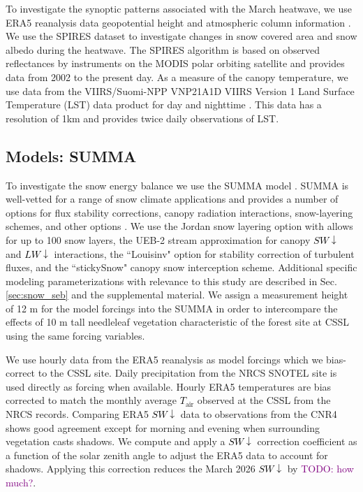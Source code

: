 \documentclass[12pt]{iopjournal}
\newcommand{\comment}[1]{\textcolor{purple}{TODO: #1}}      %
\newcommand{\tair}{\textcolor{black}{$T_{\mathrm{air}}$}\xspace}
\newcommand{\lwdn}{\textcolor{black}{$LW\downarrow$}\xspace}
\newcommand{\swdn}{\textcolor{black}{$SW\downarrow$}\xspace}
\begin{document}
To investigate the synoptic patterns associated with the March heatwave, we use ERA5 reanalysis data geopotential height and atmospheric column information \citep{Hersbach2020-era5}.
We use the SPIRES \citep{Bair2021-spires} dataset to investigate changes in snow covered area and snow albedo during the heatwave. 
The SPIRES algorithm is based on observed reflectances by instruments on the MODIS polar orbiting satellite and provides data from 2002 to the present day. 
As a measure of the canopy temperature, we use data from the VIIRS/Suomi-NPP VNP21A1D VIIRS Version 1 Land Surface Temperature (LST) data product for day and nighttime \citep{hulley2018viirs}.
This data has a resolution of 1km and provides twice daily observations of LST.


\subsection{Models: SUMMA}\label{sec:models:summa}
To investigate the snow energy balance we use the SUMMA model \citep{Clark2015-ni}.
SUMMA is well-vetted for a range of snow climate applications and provides a number of options for flux stability corrections, canopy radiation interactions, snow-layering schemes, and other options \citep{Cristea2022-ys}.
We use the Jordan snow layering option with allows for up to 100 snow layers, the UEB-2 stream approximation for canopy \swdn and \lwdn interactions, the ``Louisinv" option for stability correction of turbulent fluxes, and the ``stickySnow" canopy snow interception scheme.
Additional specific modeling parameterizations with relevance to this study are described in Sec. \ref{sec:snow_seb} and the supplemental material. 
We assign a measurement height of 12 m for the model forcings into the SUMMA in order to intercompare the effects of 10 m tall needleleaf vegetation characteristic of the forest site at CSSL using the same forcing variables. 

We use hourly data from the ERA5 reanalysis \citep{Hersbach2020-era5} as model forcings which we bias-correct to the CSSL site.
Daily precipitation from the NRCS SNOTEL site is used directly as forcing when available. 
Hourly ERA5 temperatures are bias corrected to match the monthly average \tair observed at the CSSL from the NRCS records. 
Comparing ERA5 \swdn data to observations from the CNR4 shows good agreement except for morning and evening when surrounding vegetation casts shadows. 
We compute and apply a \swdn correction coefficient as a function of the solar zenith angle to adjust the ERA5 data to account for shadows.
Applying this correction reduces the March 2026 \swdn by \comment{how much?}.
\end{document}
